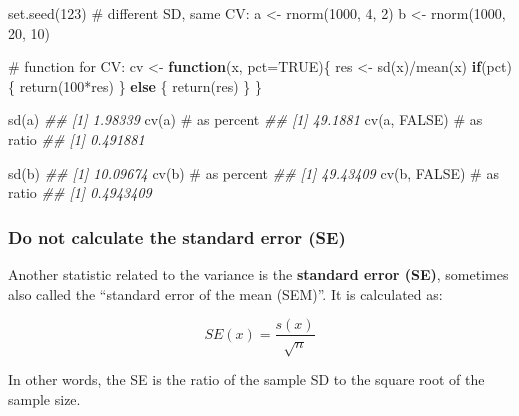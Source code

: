 \documentclass[
  13,
  letterpaper,
]{report}
\newenvironment{Shaded}{\begin{snugshade}}{\end{snugshade}}
\newcommand{\AttributeTok}[1]{\textcolor[rgb]{0.40,0.45,0.13}{#1}}
\newcommand{\CommentTok}[1]{\textcolor[rgb]{0.37,0.37,0.37}{#1}}
\newcommand{\ConstantTok}[1]{\textcolor[rgb]{0.56,0.35,0.01}{#1}}
\newcommand{\ControlFlowTok}[1]{\textcolor[rgb]{0.00,0.23,0.31}{\textbf{#1}}}
\newcommand{\DecValTok}[1]{\textcolor[rgb]{0.68,0.00,0.00}{#1}}
\newcommand{\DocumentationTok}[1]{\textcolor[rgb]{0.37,0.37,0.37}{\textit{#1}}}
\newcommand{\FunctionTok}[1]{\textcolor[rgb]{0.28,0.35,0.67}{#1}}
\newcommand{\NormalTok}[1]{\textcolor[rgb]{0.00,0.23,0.31}{#1}}
\newcommand{\OtherTok}[1]{\textcolor[rgb]{0.00,0.23,0.31}{#1}}
\newcommand{\SpecialCharTok}[1]{\textcolor[rgb]{0.37,0.37,0.37}{#1}}
\begin{document}
\begin{Shaded}
\begin{Highlighting}[]

\FunctionTok{set.seed}\NormalTok{(}\DecValTok{123}\NormalTok{)}
\CommentTok{\# different SD, same CV:}
\NormalTok{a }\OtherTok{\textless{}{-}} \FunctionTok{rnorm}\NormalTok{(}\DecValTok{1000}\NormalTok{, }\DecValTok{4}\NormalTok{, }\DecValTok{2}\NormalTok{)}
\NormalTok{b }\OtherTok{\textless{}{-}} \FunctionTok{rnorm}\NormalTok{(}\DecValTok{1000}\NormalTok{, }\DecValTok{20}\NormalTok{, }\DecValTok{10}\NormalTok{)}

\CommentTok{\# function for CV:}
\NormalTok{cv }\OtherTok{\textless{}{-}} \ControlFlowTok{function}\NormalTok{(x, }\AttributeTok{pct=}\ConstantTok{TRUE}\NormalTok{)\{}
\NormalTok{    res }\OtherTok{\textless{}{-}} \FunctionTok{sd}\NormalTok{(x)}\SpecialCharTok{/}\FunctionTok{mean}\NormalTok{(x)}
    \ControlFlowTok{if}\NormalTok{(pct)\{}
        \FunctionTok{return}\NormalTok{(}\DecValTok{100}\SpecialCharTok{*}\NormalTok{res)}
\NormalTok{    \} }\ControlFlowTok{else}\NormalTok{ \{}
        \FunctionTok{return}\NormalTok{(res)}
\NormalTok{    \}}
\NormalTok{\}}

\FunctionTok{sd}\NormalTok{(a)}
\DocumentationTok{\#\# [1] 1.98339}
\FunctionTok{cv}\NormalTok{(a)        }\CommentTok{\# as percent}
\DocumentationTok{\#\# [1] 49.1881}
\FunctionTok{cv}\NormalTok{(a, }\ConstantTok{FALSE}\NormalTok{) }\CommentTok{\# as ratio}
\DocumentationTok{\#\# [1] 0.491881}

\FunctionTok{sd}\NormalTok{(b)}
\DocumentationTok{\#\# [1] 10.09674}
\FunctionTok{cv}\NormalTok{(b)        }\CommentTok{\# as percent}
\DocumentationTok{\#\# [1] 49.43409}
\FunctionTok{cv}\NormalTok{(b, }\ConstantTok{FALSE}\NormalTok{) }\CommentTok{\# as ratio}
\DocumentationTok{\#\# [1] 0.4943409}
\end{Highlighting}
\end{Shaded}

\subsubsection{Do not calculate the standard error
(SE)}\label{sec-06-var-var-se}

Another statistic related to the variance is the \textbf{standard error
(SE)}, sometimes also called the ``standard error of the mean (SEM)''.
It is calculated as:

\[SE\left(x\right)=\frac{s\left(x\right)}{\sqrt{n}}\]

In other words, the SE is the ratio of the sample SD to the square root
of the sample size.
\end{document}
